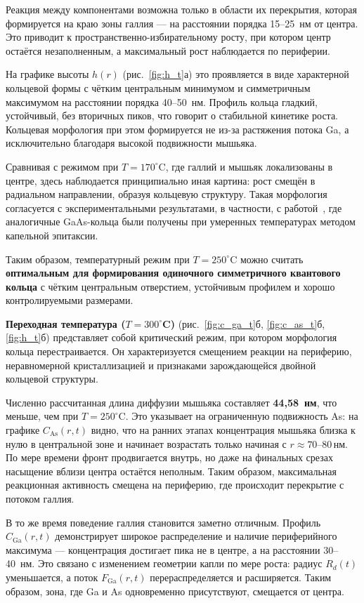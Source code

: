 \documentclass[14pt,oneside]{extarticle}
\begin{document}
Реакция между компонентами возможна только в области их перекрытия, которая формируется на краю зоны галлия — на расстоянии порядка 15–25~нм от центра. Это приводит к пространственно-избирательному росту, при котором центр остаётся незаполненным, а максимальный рост наблюдается по периферии.

На графике высоты $h(r)$ (рис.~\ref{fig:h_t}а) это проявляется в виде характерной кольцевой формы с чётким центральным минимумом и симметричным максимумом на расстоянии порядка 40–50~нм. Профиль кольца гладкий, устойчивый, без вторичных пиков, что говорит о стабильной кинетике роста. Кольцевая морфология при этом формируется не из-за растяжения потока Ga, а исключительно благодаря высокой подвижности мышьяка.

Сравнивая с режимом при $T = 170^\circ$C, где галлий и мышьяк локализованы в центре, здесь наблюдается принципиально иная картина: рост смещён в радиальном направлении, образуя кольцевую структуру. Такая морфология согласуется с экспериментальными результатами, в частности, с работой~\cite{mano2005nano}, где аналогичные GaAs-кольца были получены при умеренных температурах методом капельной эпитаксии.

Таким образом, температурный режим при $T = 250^\circ$C можно считать \textbf{оптимальным для формирования одиночного симметричного квантового кольца} с чётким центральным отверстием, устойчивым профилем и хорошо контролируемыми размерами.

\textbf{Переходная температура ($T = 300^\circ$C)} (рис.~\ref{fig:c_ga_t}б, \ref{fig:c_as_t}б, \ref{fig:h_t}б) представляет собой критический режим, при котором морфология кольца перестраивается. Он характеризуется смещением реакции на периферию, неравномерной кристаллизацией и признаками зарождающейся двойной кольцевой структуры.

Численно рассчитанная длина диффузии мышьяка составляет \textbf{44{,}58~нм}, что меньше, чем при $T = 250^\circ$C. Это указывает на ограниченную подвижность As: на графике $C_{\text{As}}(r, t)$ видно, что на ранних этапах концентрация мышьяка близка к нулю в центральной зоне и начинает возрастать только начиная с $r \approx 70$–80\,нм. По мере времени фронт продвигается внутрь, но даже на финальных срезах насыщение вблизи центра остаётся неполным. Таким образом, максимальная реакционная активность смещена на периферию, где происходит перекрытие с потоком галлия.

В то же время поведение галлия становится заметно отличным. Профиль $C_{\text{Ga}}(r, t)$ демонстрирует широкое распределение и наличие периферийного максимума — концентрация достигает пика не в центре, а на расстоянии 30–40~нм. Это связано с изменением геометрии капли по мере роста: радиус \( R_d(t) \) уменьшается, а поток $F_{\text{Ga}}(r, t)$ перераспределяется и расширяется. Таким образом, зона, где Ga и As одновременно присутствуют, смещается от центра.
\end{document}
